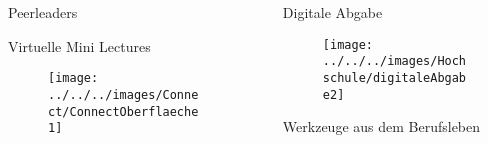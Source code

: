 \documentclass[final,hyperref={pdfpagelabels=false}]{beamer}
\begin{document}
\begin{frame}[t]
\begin{columns}[t]
\begin{column}{.465\textwidth}
\begin{block}{Peerleaders}
\end{block}


\begin{block}{Virtuelle Mini Lectures}

\vspace{24px}

    \begin{figure}
        \centering
        \texttt{[image: ../../../images/Connect/ConnectOberflaeche1]}
        \label{fig:itasprechstundenlayout}
    \end{figure}

\end{block}


\end{column} %

\begin{column}{.03\textwidth}\end{column} %

\begin{column}{.465\textwidth} %



\begin{block}{Digitale Abgabe}

    \begin{figure}
        \centering
        \texttt{[image: ../../../images/Hochschule/digitaleAbgabe2]}
        \label{fig:disgitaleabgabe}
    \end{figure}

\end{block}


\begin{block}{Werkzeuge aus dem Berufsleben}


\end{block}
\end{column}
\end{columns}
\end{frame}
\end{document}
